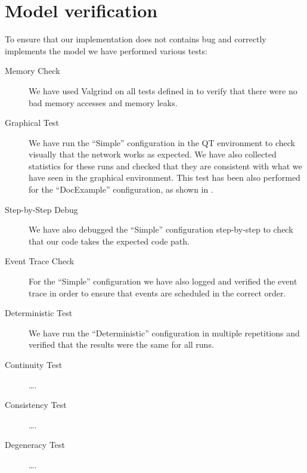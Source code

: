 \section{Model verification}\label{sec:verification}

To ensure that our implementation does not contains bug and correctly implements
the model we have performed various tests:
\begin{description}
	\item[Memory Check] We have used Valgrind on all tests defined in
		 to verify that there were no bad memory
		accesses and memory leaks.
	\item[Graphical Test] We have run the ``Simple'' configuration in the
		\omnetpp{} QT environment to check visually that the network
		works as expected. We have also collected statistics for these
		runs and checked that they are consistent with what we have seen
		in the graphical environment. This test has been also performed
		for the ``DocExample'' configuration, as shown in
		.
	\item[Step-by-Step Debug] We have also debugged the ``Simple''
		configuration step-by-step to check that our code takes the
		expected code path.
	\item[Event Trace Check] For the ``Simple'' configuration we have also
		logged and verified the event trace in order to ensure that
		events are scheduled in the correct order.
	\item[Deterministic Test] We have run the ``Deterministic''
		configuration in multiple repetitions and verified that the
		results were the same for all runs.
	\item[Continuity Test] \ldots.
	\item[Consistency Test] \ldots.
	\item[Degeneracy Test] \ldots.
\end{description}
